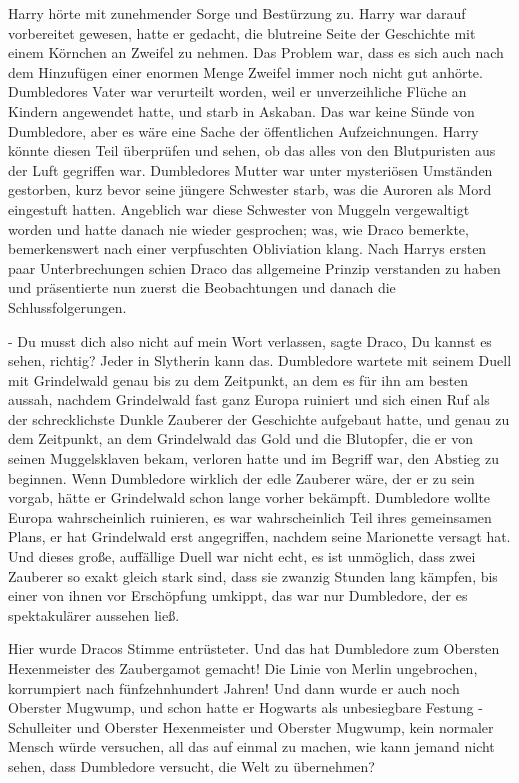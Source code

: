 Harry hörte mit zunehmender Sorge und Bestürzung zu. Harry war darauf
vorbereitet gewesen, hatte er gedacht, die blutreine Seite der Geschichte mit
einem Körnchen an Zweifel zu nehmen. Das Problem war, dass es sich auch nach dem
Hinzufügen einer enormen Menge Zweifel immer noch nicht gut anhörte. Dumbledores
Vater war verurteilt worden, weil er unverzeihliche Flüche an Kindern angewendet
hatte, und starb in Askaban. Das war keine Sünde von Dumbledore, aber es wäre
eine Sache der öffentlichen Aufzeichnungen. Harry könnte diesen Teil überprüfen
und sehen, ob das alles von den Blutpuristen aus der Luft gegriffen war.
Dumbledores Mutter war unter mysteriösen Umständen gestorben, kurz bevor seine
jüngere Schwester starb, was die Auroren als Mord eingestuft hatten. Angeblich
war diese Schwester von Muggeln vergewaltigt worden und hatte danach nie wieder
gesprochen; was, wie Draco bemerkte, bemerkenswert nach einer verpfuschten
Obliviation klang. Nach Harrys ersten paar Unterbrechungen schien Draco das
allgemeine Prinzip verstanden zu haben und präsentierte nun zuerst die
Beobachtungen und danach die Schlussfolgerungen.

\glqq{}- Du musst dich also nicht auf mein Wort verlassen\grqq{}, sagte Draco,
\glqq{}Du kannst es sehen, richtig? Jeder in Slytherin kann das. Dumbledore
wartete mit seinem Duell mit Grindelwald genau bis zu dem Zeitpunkt, an dem es
für ihn am besten aussah, nachdem Grindelwald fast ganz Europa ruiniert und sich
einen Ruf als der schrecklichste Dunkle Zauberer der Geschichte aufgebaut hatte,
und genau zu dem Zeitpunkt, an dem Grindelwald das Gold und die Blutopfer, die
er von seinen Muggelsklaven bekam, verloren hatte und im Begriff war, den
Abstieg zu beginnen. Wenn Dumbledore wirklich der edle Zauberer wäre, der er zu
sein vorgab, hätte er Grindelwald schon lange vorher bekämpft. Dumbledore wollte
Europa wahrscheinlich ruinieren, es war wahrscheinlich Teil ihres gemeinsamen
Plans, er hat Grindelwald erst angegriffen, nachdem seine Marionette versagt
hat. Und dieses große, auffällige Duell war nicht echt, es ist unmöglich, dass
zwei Zauberer so exakt gleich stark sind, dass sie zwanzig Stunden lang kämpfen,
bis einer von ihnen vor Erschöpfung umkippt, das war nur Dumbledore, der es
spektakulärer aussehen ließ.\grqq{}

Hier wurde Dracos Stimme entrüsteter. \glqq{}Und das hat Dumbledore zum Obersten
Hexenmeister des Zaubergamot gemacht! Die Linie von Merlin ungebrochen,
korrumpiert nach fünfzehnhundert Jahren! Und dann wurde er auch noch Oberster
Mugwump, und schon hatte er Hogwarts als unbesiegbare Festung - Schulleiter und
Oberster Hexenmeister und Oberster Mugwump, kein normaler Mensch würde
versuchen, all das auf einmal zu machen, wie kann jemand nicht sehen, dass
Dumbledore versucht, die Welt zu übernehmen?\grqq{}

